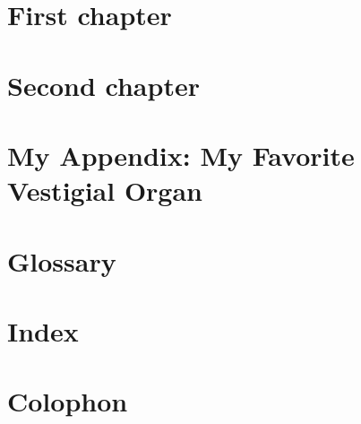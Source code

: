 \documentclass[capstoc,capschap]{rpisudiss}
\begin{document}
\frontmatter

\tableofcontents

\mainmatter %

\chapter{First chapter}
\chapter{Second chapter}

\appendix

\chapter{My Appendix: My Favorite Vestigial Organ}
\blindtext

\backmatter

\chapter{Glossary}
\chapter{Index}
\chapter{Colophon}
\end{document}
